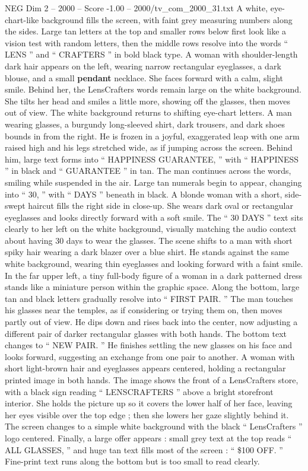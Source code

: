 \begin{textsample}{NEG Dim 2 – 2000 – Score -1.00 – 2000/tv\_com\_2000\_31.txt}  \label{ex:f2_neg_074}
A white, eye-chart-like background fills the screen, with faint grey measuring numbers along the sides.
Large tan letters at the top and smaller rows below first look like a vision test with random letters, then the middle rows resolve into the words “ LENS ” and “ CRAFTERS ” in bold black type.
A woman with shoulder-length dark hair appears on the left, wearing narrow rectangular eyeglasses, a dark blouse, and a small \textbf{pendant} necklace.
She faces forward with a calm, slight smile.
Behind her, the LensCrafters words remain large on the white background.
She tilts her head and smiles a little more, showing off the glasses, then moves out of view.
The white background returns to shifting eye-chart letters.
A man wearing glasses, a burgundy long-sleeved shirt, dark trousers, and dark shoes bounds in from the right.
He is frozen in a joyful, exaggerated leap with one arm raised high and his legs stretched wide, as if jumping across the screen.
Behind him, large text forms into “ HAPPINESS GUARANTEE, ” with “ HAPPINESS ” in black and “ GUARANTEE ” in tan.
The man continues across the words, smiling while suspended in the air.
Large tan numerals begin to appear, changing into “ 30, ” with “ DAYS ” beneath in black.
A blonde woman with a short, side-swept haircut fills the right side in close-up.
She wears dark oval or rectangular eyeglasses and looks directly forward with a soft smile.
The “ 30 DAYS ” text sits clearly to her left on the white background, visually matching the audio context about having 30 days to wear the glasses.
The scene shifts to a man with short spiky hair wearing a dark blazer over a blue shirt.
He stands against the same white background, wearing thin eyeglasses and looking forward with a faint smile.
In the far upper left, a tiny full-body figure of a woman in a dark patterned dress stands like a miniature person within the graphic space.
Along the bottom, large tan and black letters gradually resolve into “ FIRST PAIR. ” The man touches his glasses near the temples, as if considering or trying them on, then moves partly out of view.
He dips down and rises back into the center, now adjusting a different pair of darker rectangular glasses with both hands.
The bottom text changes to “ NEW PAIR. ” He finishes settling the new glasses on his face and looks forward, suggesting an exchange from one pair to another.
A woman with short light-brown hair and eyeglasses appears centered, holding a rectangular printed image in both hands.
The image shows the front of a LensCrafters store, with a black sign reading “ LENSCRAFTERS ” above a bright storefront interior.
She holds the picture up so it covers the lower half of her face, leaving her eyes visible over the top edge ; then she lowers her gaze slightly behind it.
The screen changes to a simple white background with the black “ LensCrafters ” logo centered.
Finally, a large offer appears : small grey text at the top reads “ ALL GLASSES, ” and huge tan text fills most of the screen : “ \$100 OFF. ” Fine-print text runs along the bottom but is too small to read clearly.

\end{textsample}
